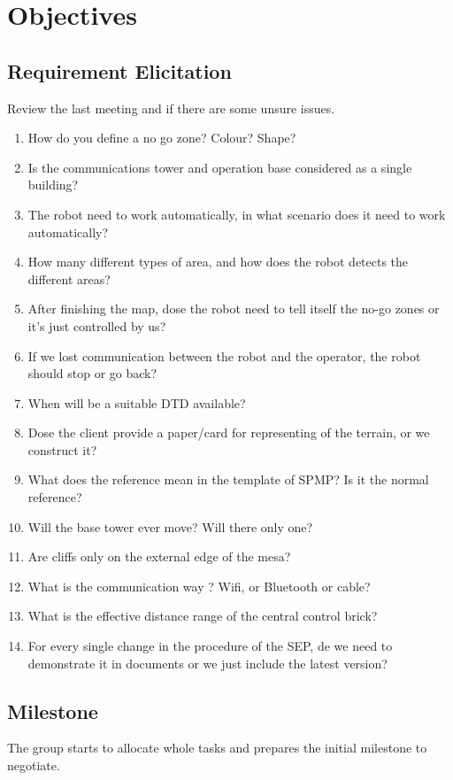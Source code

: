 \documentclass[a4paper] {article}
\begin{document}
	\section{Objectives}
	\subsection{Requirement Elicitation}			
	Review the last meeting and if there are some unsure issues.
	
	\begin{enumerate}
	\item How do you define a no go zone? Colour? Shape?
	\item Is the communications tower and operation base considered as a single building?
	\item The robot need to work automatically, in what scenario does it need to work automatically?
	\item How many different types of area, and how does the robot detects the different areas? 
	\item After finishing the map, dose the robot need to tell itself the no-go zones or it's just controlled by us?
	\item If we lost communication between the robot and the operator, the robot should stop or go back?
	\item When will be a suitable DTD available?
	\item Dose the client provide a paper/card for representing of the terrain, or we construct it?
	\item What does the reference mean in the template of SPMP? Is it the normal reference?
	\item Will the base tower ever move? Will there only one?
	\item Are cliffs only on the external edge of the mesa?
	\item What is the communication way ? Wifi, or Bluetooth or cable?
	\item What is the effective distance range of the central control brick?
	\item For every single change in the procedure of the SEP, de we need to demonstrate it in documents or we just include the latest version?
\end{enumerate}
	
	\subsection{Milestone}
	The group starts to allocate whole tasks and prepares the initial milestone to negotiate.
\end{document}
